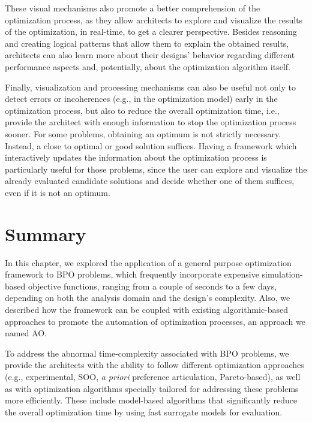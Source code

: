 These visual mechanisms also promote a better comprehension of the optimization process, as they allow architects to explore and visualize the results of the optimization, in real-time, to get a clearer perspective. Besides reasoning and creating logical patterns that allow them to explain the obtained results, architects can also learn more about their designs' behavior regarding different performance aspects and, potentially, about the optimization algorithm itself.

Finally, visualization and processing mechanisms can also be useful not only to detect errors or incoherences (e.g., in the optimization model) early in the optimization process, but also to reduce the overall optimization time, i.e.,  provide the architect with enough information to stop the optimization process sooner. For some problems, obtaining an optimum is not strictly necessary. Instead, a close to optimal or good solution suffices. Having a framework which interactively updates the information about the optimization process is particularly useful for those problems, since the user can explore and visualize the already evaluated candidate solutions and decide whether one of them suffices, even if it is not an optimum. 

\section{Summary}
In this chapter, we explored the application of a general purpose optimization framework to \ac{BPO} problems, which frequently incorporate expensive simulation-based objective functions, ranging from a couple of seconds to a few days, depending on both the analysis domain and the design's complexity. Also, we described how the framework can be coupled with existing algorithmic-based approaches to promote the automation of optimization processes, an approach we named \ac{AO}.

To address the abnormal time-complexity associated with \ac{BPO} problems, we provide the architects with the ability to follow different optimization approaches (e.g., experimental, \ac{SOO}, \textit{a priori} preference articulation, Pareto-based), as well as with optimization algorithms specially tailored for addressing these problems more efficiently. These include model-based algorithms that significantly reduce the overall optimization time by using fast surrogate models for evaluation. %

